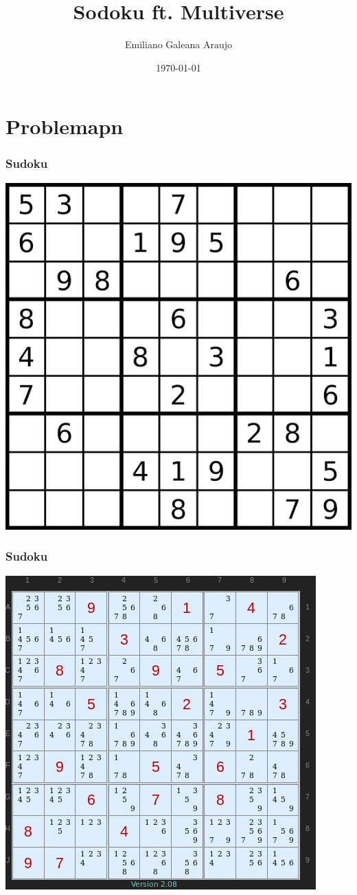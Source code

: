 \documentclass{beamer}
\title[HOC]{Sodoku ft. Multiverse}
\author{Emiliano Galeana Araujo}
\institute{Universidad Nacional Autónoma de México}
\date{\today}
\begin{document}
\frame{\titlepage}

\section{Problemapn}
\begin{frame}
  \frametitle{Sudoku}
  \begin{center}
    \includegraphics[scale=0.3]{sudoku.png}
  \end{center}
\end{frame}

\begin{frame}
  \frametitle{Sudoku}
  \begin{center}
    \includegraphics[scale=0.3]{imposible.jpg}
  \end{center}
\end{frame}
\end{document}
